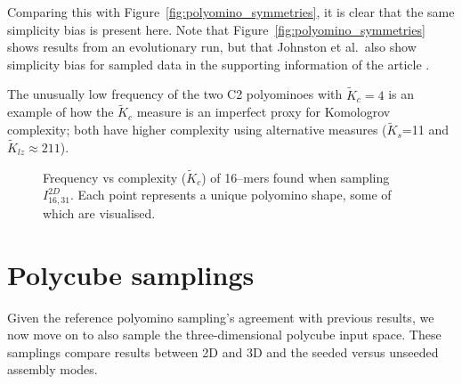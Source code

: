 Comparing this with Figure~\ref{fig:polyomino_symmetries}, it is clear that the same simplicity bias is present here. Note that Figure~\ref{fig:polyomino_symmetries} shows results from an evolutionary run, but that Johnston et al.\ also show simplicity bias for sampled data in the supporting information of the article \cite{johnston2021}. %

The unusually low frequency of the two C2 polyominoes with \(\widetilde{K}_c = 4\) is an example of how the \(\widetilde{K}_c\) measure is an imperfect proxy for Komologrov complexity; both have higher complexity using alternative measures (\(\widetilde{K}_s\)=11 and \(\widetilde{K}_{lz} \approx 211\)).

\begin{figure}[h]
    \centering
    
    \caption{Frequency vs complexity (\(\widetilde{K}_c\)) of 16--mers found when sampling \(I_{16,31}^{2D}\). Each point represents a unique polyomino shape, some of which are visualised.}
    \label{fig:freq_vs_compl_refcalc}
\end{figure}



\section{Polycube samplings}
\label{sec:maincalc}



Given the reference polyomino sampling's agreement with previous results, we now move on to also sample the three-dimensional polycube input space. These samplings compare results between 2D and 3D and the seeded versus unseeded assembly modes.

